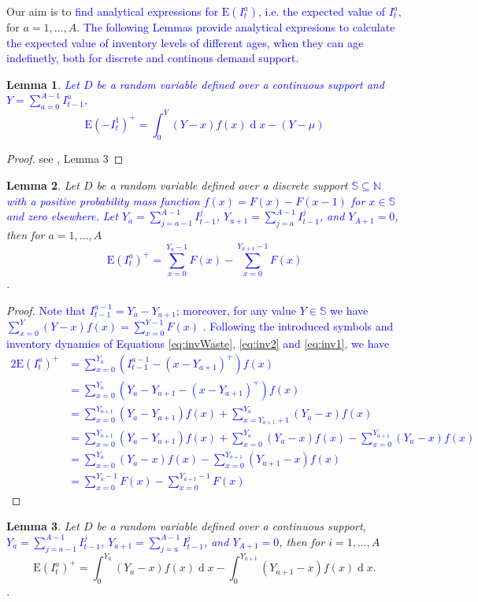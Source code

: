 \documentclass{tPRS2e}
\renewcommand{\d}[1]{\ensuremath{\operatorname{d}\!{#1}}}
\newcommand{\blue}{\textcolor{blue}}
\newtheorem{lem}{Lemma}
\begin{document}
Our aim is to \blue{find analytical expressions for $\mathrm{E}(I^a_{t})$, i.e. the expected value of $I^a_{t}$}, for $a=1,\ldots,A$. \blue{The following Lemmas provide analytical expresions to calculate the expected value of inventory levels of different ages, when they can age indefinetly, both for discrete and continous demand support.}
%	
\begin{lem} 
\blue{Let $D$ be a random variable defined over a continuous support and $Y=\sum_{a=0}^{A-1} I^a_{t-1}$, 
		 \[\mathrm{E}(-I^1_{t})^+=\int_0^Y(Y-x)f(x)\d x-(Y-\mu)\]}
	\end{lem}
	\begin{proof}
		see \cite{citeulike:13075114}, Lemma 3
	\end{proof}
%	
	\begin{lem}\label{lem:age_expectation_disc}
		Let $D$ be a random variable defined over a discrete support \blue{$\mathbb{S}\subseteq \mathbb N$ with a positive probability mass function $f(x)=F(x)-F(x-1)$ for $x\in\mathbb S$ and zero elsewhere. Let $Y_a=\sum_{j=a-1}^{A-1} I^j_{t-1}$, $Y_{a+1}=\sum_{j=a}^{A-1} I^j_{t-1}$, and $Y_{A+1}=0$}, then for $a=1,\ldots,A$ \blue{
		\[\mathrm{E}(I^a_{t})^+=\sum_{x=0}^{Y_a-1}F(x)-\sum_{x=0}^{Y_{a+1}-1}F(x)\]
		}.
	\end{lem}
	\begin{proof} \blue{ Note that $I^{a-1}_{t-1}=Y_a-Y_{a+1}$; moreover, for any value $Y\in \mathbb S$ we have $\sum_{x=0}^Y (Y-x) f(x) = \sum_{x=0}^{Y-1} F(x)$ \citep{citeulike:13075114}. Following the introduced symbols and inventory dynamics of Equations \eqref{eq:invWaste}, \eqref{eq:inv2} and \eqref{eq:inv1}, we have
		\begin{alignat}{2}
			\mathrm{E}(I^a_{t})^+
			&=\sum_{x=0}^{Y_a}(I^{a-1}_{t-1}-(x-Y_{a+1})^+)f(x)\nonumber\\
			&=\sum_{x=0}^{Y_a}(Y_a-Y_{a+1}-(x-Y_{a+1})^+)f(x)\nonumber\\
			&=\sum_{x=0}^{Y_{a+1}}(Y_a-Y_{a+1})f(x)+\sum_{x=Y_{a+1}+1}^{Y_a}(Y_{a}-x)f(x)\nonumber\\
			&=\sum_{x=0}^{Y_{a+1}}(Y_a-Y_{a+1})f(x)+\sum_{x=0}^{Y_a}(Y_a-x)f(x)-\sum_{x=0}^{Y_{a+1}}(Y_{a}-x)f(x)\nonumber\\
			&=\sum_{x=0}^{Y_a}(Y_a-x)f(x)-\sum_{x=0}^{Y_{a+1}}(Y_{a+1}-x)f(x)\nonumber\\
			&=\sum_{x=0}^{Y_a-1}F(x)-\sum_{x=0}^{Y_{a+1}-1}F(x)\nonumber
		\end{alignat}}
	\end{proof}
%	
	\begin{lem}
		Let $D$ be a random variable defined over a continuous support, \blue{$Y_a=\sum_{j=a-1}^{A-1} I^j_{t-1}$, $Y_{a+1}=\sum_{j=a}^{A-1} I^{j}_{t-1}$, and $Y_{A+1}=0$}, then for $i=1,\ldots,A$
		\[\mathrm{E}(I^a_{t})^+=\int_0^{Y_a}(Y_a-x)f(x)\d x-\int_0^{Y_{a+1}}(Y_{a+1}-x)f(x)\d x .\]. 
	\end{lem}
\end{document}
